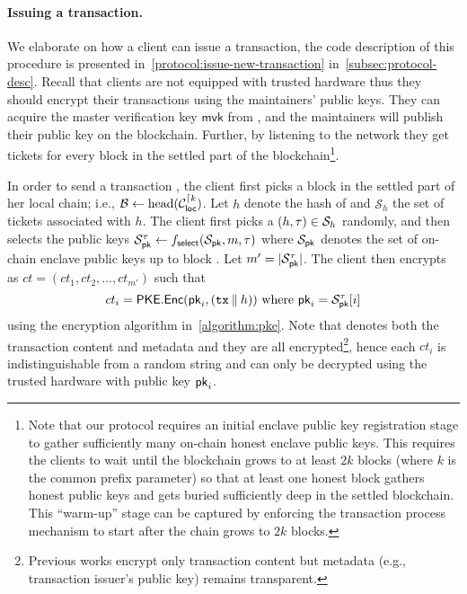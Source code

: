 \paragraph{Issuing a transaction.}
%
We elaborate on how a client can issue a transaction, the code description of this procedure is presented in~\cref{protocol:issue-new-transaction} in~\cref{subsec:protocol-desc}.
%
Recall that clients are not equipped with trusted hardware thus they should encrypt their transactions using the maintainers' public keys.
%
They can acquire the master verification key $\mathsf{mvk}$ from \funcEnclave, and the maintainers will publish their public key on the blockchain.
%
Further, by listening to the network they get tickets for every block in the settled part of the blockchain\footnote{Note that our protocol requires an initial enclave public key registration stage to gather sufficiently many on-chain honest enclave public keys. This requires the clients to wait until the blockchain grows to at least $2k$ blocks (where $k$ is the common prefix parameter) so that at least one honest block gathers honest public keys and gets buried sufficiently deep in the settled blockchain. This ``warm-up'' stage can be captured by enforcing the transaction process mechanism to start after the chain grows to $2k$ blocks.}.

In order to send a transaction \tx, the client first picks a block \block in the settled part of her local chain; i.e., $\mathcal{B} \gets \mathrm{head}(\mathcal{C}_{\mathsf{loc}}^{\lceil{\ensuremath{k}}})$.
%
Let $h$ denote the hash of \block and $\mathcal{S}_h$ the set of tickets associated with $h$.
%
The client first picks a $(h, \mathsf{\tau}) \in \mathcal{S}_h$ randomly, and then selects the public keys $\mathcal{S}^\mathsf{\tau}_{\mathsf{pk}} \gets f_{\mathsf{select}}(\mathcal{S}_{\mathsf{pk}}, m, \mathsf{\tau})$ where $\mathcal{S}_{\mathsf{pk}}$ denotes the set of on-chain enclave public keys up to block \block.
%
Let $m' = |\mathcal{S}^\mathsf{\tau}_{\mathsf{pk}}|$.
%
The client then encrypts \tx as $ct = (ct_1, ct_2, \ldots, ct_{m'})$ such that
%
\[ ct_i = \mathsf{PKE}.\mathsf{Enc}(\mathsf{pk}_i, (\mathtt{tx} \mathbin\Vert h)) ~\mathrm{where}~ \mathsf{pk}_i = \mathcal{S}^\mathsf{\tau}_{\mathsf{pk}}[i] \]
%
using the encryption algorithm in~\cref{algorithm:pke}.
%
Note that \tx denotes both the transaction content and metadata and they are all encrypted\footnote{Previous works encrypt only transaction content but metadata (e.g., transaction issuer's public key) remains transparent.}, hence each $ct_i$ is indistinguishable from a random string and can only be decrypted using the trusted hardware with public key $\mathsf{pk}_i$.

